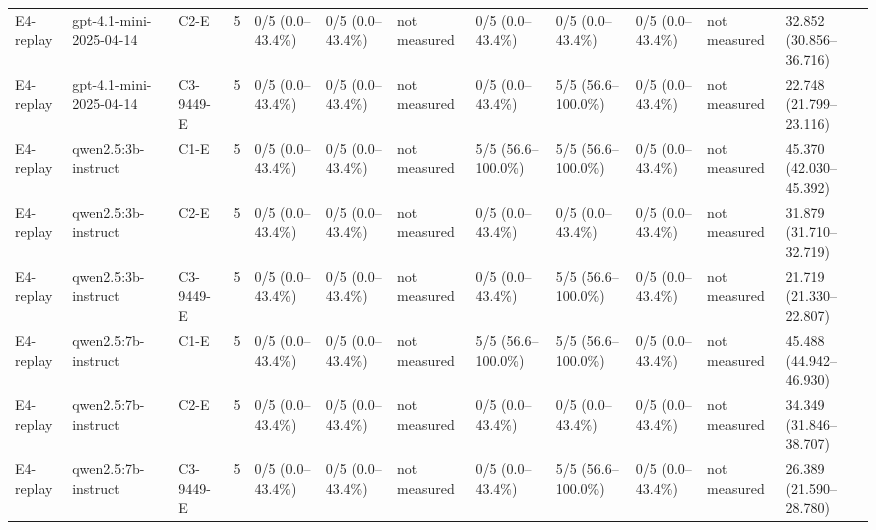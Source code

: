 \begin{tabular}{llllllllllll}
E4-replay & gpt-4.1-mini-2025-04-14 & C2-E & 5 & 0/5 (0.0--43.4\%) & 0/5 (0.0--43.4\%) & not measured & 0/5 (0.0--43.4\%) & 0/5 (0.0--43.4\%) & 0/5 (0.0--43.4\%) & not measured & 32.852 (30.856--36.716) \\
E4-replay & gpt-4.1-mini-2025-04-14 & C3-9449-E & 5 & 0/5 (0.0--43.4\%) & 0/5 (0.0--43.4\%) & not measured & 0/5 (0.0--43.4\%) & 5/5 (56.6--100.0\%) & 0/5 (0.0--43.4\%) & not measured & 22.748 (21.799--23.116) \\
E4-replay & qwen2.5:3b-instruct & C1-E & 5 & 0/5 (0.0--43.4\%) & 0/5 (0.0--43.4\%) & not measured & 5/5 (56.6--100.0\%) & 5/5 (56.6--100.0\%) & 0/5 (0.0--43.4\%) & not measured & 45.370 (42.030--45.392) \\
E4-replay & qwen2.5:3b-instruct & C2-E & 5 & 0/5 (0.0--43.4\%) & 0/5 (0.0--43.4\%) & not measured & 0/5 (0.0--43.4\%) & 0/5 (0.0--43.4\%) & 0/5 (0.0--43.4\%) & not measured & 31.879 (31.710--32.719) \\
E4-replay & qwen2.5:3b-instruct & C3-9449-E & 5 & 0/5 (0.0--43.4\%) & 0/5 (0.0--43.4\%) & not measured & 0/5 (0.0--43.4\%) & 5/5 (56.6--100.0\%) & 0/5 (0.0--43.4\%) & not measured & 21.719 (21.330--22.807) \\
E4-replay & qwen2.5:7b-instruct & C1-E & 5 & 0/5 (0.0--43.4\%) & 0/5 (0.0--43.4\%) & not measured & 5/5 (56.6--100.0\%) & 5/5 (56.6--100.0\%) & 0/5 (0.0--43.4\%) & not measured & 45.488 (44.942--46.930) \\
E4-replay & qwen2.5:7b-instruct & C2-E & 5 & 0/5 (0.0--43.4\%) & 0/5 (0.0--43.4\%) & not measured & 0/5 (0.0--43.4\%) & 0/5 (0.0--43.4\%) & 0/5 (0.0--43.4\%) & not measured & 34.349 (31.846--38.707) \\
E4-replay & qwen2.5:7b-instruct & C3-9449-E & 5 & 0/5 (0.0--43.4\%) & 0/5 (0.0--43.4\%) & not measured & 0/5 (0.0--43.4\%) & 5/5 (56.6--100.0\%) & 0/5 (0.0--43.4\%) & not measured & 26.389 (21.590--28.780) \\
\hline
\end{tabular}
